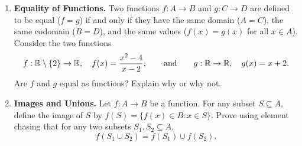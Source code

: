 \begin{enumerate}
\item \textbf{Equality of Functions.} Two functions $f: A \to B$ and $g: C \to D$ are defined to be equal ($f = g$) if and only if they have the same domain ($A = C$), the same codomain ($B = D$), and the same values ($f(x) = g(x)$ for all $x \in A$).
Consider the two functions
\[
f: \mathbb{R} \setminus \{2\} \to \mathbb{R}, \quad f(x) = \frac{x^2 - 4}{x - 2}, \qquad\text{and}\qquad g: \mathbb{R} \to \mathbb{R}, \quad g(x) = x + 2.
\]
Are $f$ and $g$ equal as functions? Explain why or why not.

\item \textbf{Images and Unions.} Let $f: A \to B$ be a function. For any subset $S \subseteq A$, define the image of $S$ by $f(S) = \{f(x) \in B : x \in S\}$. Prove using element chasing that for any two subsets $S_1, S_2 \subseteq A$,
\[
f(S_1 \cup S_2) = f(S_1) \cup f(S_2).
\]
\end{enumerate}

\newpage
